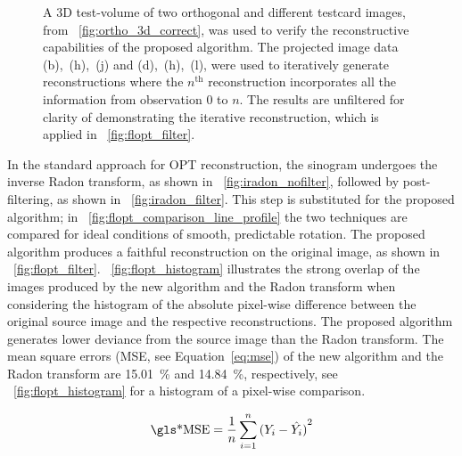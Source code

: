 \documentclass[times, twoside, watermark]{zHenriquesLab-StyleBioRxiv}
\begin{document}
\begin{figure}
\begin{subfigure}[t]{0.2\linewidth}
    \end{subfigure}
    \caption[A 3D test-volume of two orthogonal and different testcard images, was used to verify the reconstructive capabilities of the proposed algorithm]{
    A 3D test-volume of two orthogonal and different testcard images, from \figurename~\ref{fig:ortho_3d_correct}, was used to verify the reconstructive capabilities of the proposed algorithm.
    The projected image data (b),~(h),~(j) and (d),~(h),~(l), were used to iteratively generate reconstructions where the \(n^\text{th}\) reconstruction incorporates all the information from observation 0 to \(n\).
    The results are unfiltered for clarity of demonstrating the iterative reconstruction, which is applied in \figurename~\ref{fig:flopt_filter}.
    }\label{fig:recon_iterative}
\end{figure}

In the standard approach for \gls*{OPT} reconstruction, the sinogram undergoes the inverse \gls*{Radon transform}, as shown in \figurename~\ref{fig:iradon_nofilter}, followed by post-filtering, as shown in \figurename~\ref{fig:iradon_filter}.
This step is substituted for the proposed algorithm; in \figurename~\ref{fig:flopt_comparison_line_profile} the two techniques are compared for ideal conditions of smooth, predictable rotation.
The proposed algorithm produces %
a faithful reconstruction on the original image, as shown in \figurename~\ref{fig:flopt_filter}. %
\figurename~\ref{fig:flopt_histogram} illustrates the strong overlap of the images produced by the new algorithm and the \gls*{Radon transform} when considering the histogram of the absolute pixel-wise difference between the original source image and the respective reconstructions.
The proposed algorithm generates lower deviance from the source image than the Radon transform.
The mean square errors (\gls*{MSE}, see Equation~\eqref{eq:mse}) of the new algorithm and the \gls*{Radon transform} are \SI{15.01}{\percent} and \SI{14.84}{\percent}, respectively, see \figurename~\ref{fig:flopt_histogram} for a histogram of a pixel-wise comparison.

\begin{align}
    \operatorname{\gls*{MSE}}=\frac{1}{n}\sum_{i=1}^n{(Y_i-\hat{Y_i})}^2 \label{eq:mse} %
\end{align}
\end{document}
